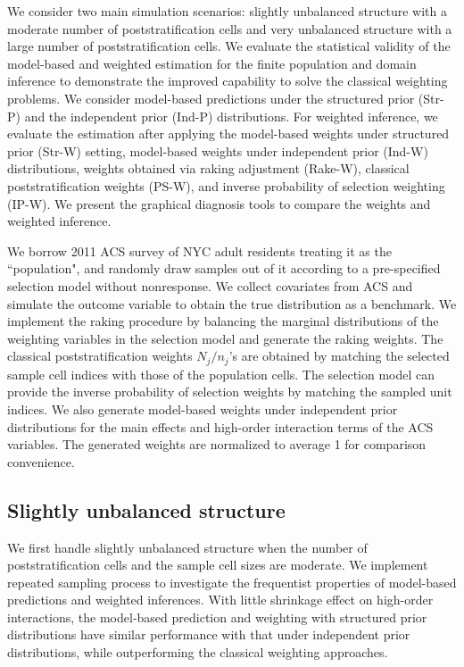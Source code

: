 \documentclass[11pt]{article}
\numberwithin{figure}{section}
\numberwithin{table}{section}
\numberwithin{equation}{section}
\begin{document}
We consider two main simulation scenarios: slightly unbalanced structure with a
moderate number of poststratification cells and very unbalanced structure with
a large number of poststratification cells. We evaluate the statistical
validity of the model-based and weighted estimation for the finite population
and domain inference to demonstrate the improved capability to solve the
classical weighting problems. We consider model-based predictions under the
structured prior (Str-P) and the independent prior (Ind-P) distributions. For
weighted inference, we evaluate the estimation after applying the model-based
weights under structured prior (Str-W) setting, model-based weights under
independent prior (Ind-W) distributions, weights obtained via raking adjustment
(Rake-W), classical poststratification weights (PS-W), and inverse probability
of selection weighting (IP-W). We present the graphical diagnosis tools to
compare the weights and weighted inference.

We borrow 2011 ACS survey of NYC adult residents treating it as the
``population", and randomly draw samples out of it according to a pre-specified
selection model without nonresponse. We collect covariates from ACS and
simulate the outcome variable to obtain the true distribution as a benchmark.
We implement the raking procedure by balancing the marginal distributions of
the weighting variables in the selection model and generate the raking weights.
The classical poststratification weights $N_j/n_j$'s are obtained by matching
the selected sample cell indices with those of the population cells. The
selection model can provide the inverse probability of selection weights by
matching the sampled unit indices. We also generate model-based weights under
independent prior distributions for the main effects and high-order interaction
terms of the ACS variables. The generated weights are normalized to average 1
for comparison convenience. 

\subsection{Slightly unbalanced structure} \label{3var}

We first handle slightly unbalanced structure when the number of
poststratification cells and the sample cell sizes are moderate. We implement
repeated sampling process to investigate the frequentist properties of
model-based predictions and weighted inferences. With little shrinkage effect
on high-order interactions, the model-based prediction and weighting with
structured prior distributions have similar performance with that under
independent prior distributions, while outperforming the classical weighting
approaches. 
\end{document}
